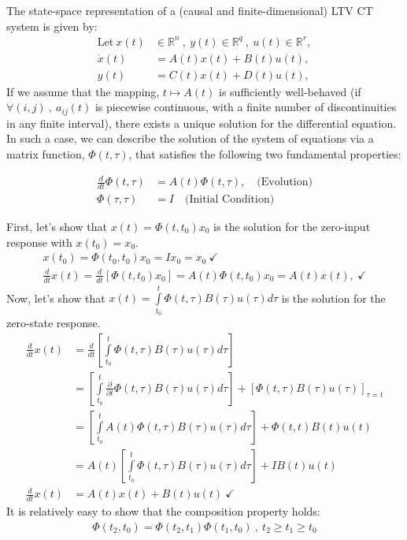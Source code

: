 \documentclass[twoside]{article}
\begin{document}
The state-space representation of a (causal and finite-dimensional) LTV CT system is given by:
%
\begin{align*}
  \mathrm{Let} \ x(t) &\in \mathbb{R}^n \ , \ y(t) \in \mathbb{R}^q \ ,\  u(t) \in \mathbb{R}^r , \\
  \dot{x}(t) &= A(t) x(t) + B(t) u(t) , \\
  y(t) &= C(t) x(t) + D(t) u(t) , 
\end{align*}
%
If we assume that the mapping, $t \mapsto A(t)$ is sufficiently well-behaved (if $\forall (i,j) \ , \ a_{ij}(t)$ is piecewise continuous, with a finite number of discontinuities in any finite interval), there exists a unique solution for the differential equation. In such a case, we can describe the solution of the system of equations via a matrix function, $\Phi(t , \tau)$, that satisfies the following two fundamental properties:
%
\begin{mdframed}[backgroundcolor=black!5, linecolor=black!20]
\begin{align*}
	\frac{d}{dt} \Phi(t , \tau) &= A(t) \Phi(t , \tau) , \quad \text{(Evolution)}
	\\
	\Phi(\tau , \tau) &= I \quad \text{(Initial Condition)}
\end{align*}
\end{mdframed}
%
First, let's show that $x(t) = \Phi(t , t_0) x_0$ is the solution for the zero-input response with $x(t_0) = x_0$.
%
\begin{align*}
	x(t_0) = \Phi(t_0 , t_0) x_0 = I x_0 = x_0 \ \checkmark
	\\
	\frac{d}{dt} x(t) = \frac{d}{dt} \left[ \Phi(t , t_0) x_0 \right] = A(t) \Phi(t , t_0 ) x_0 = A(t) x(t) , \ \checkmark
\end{align*}
%
Now, let's show that $x(t) = \int\limits_{t_0}^{t} \Phi(t , \tau) B(\tau) u(\tau) d\tau$ is the solution for the zero-state response.
%
\begin{align*}
	\frac{d}{dt} x(t) &= \frac{d}{dt} \left[ \int\limits_{t_0}^{t} \Phi(t , \tau) B(\tau) u(\tau) d\tau \right]
	\\
	&= \left[ \int\limits_{t_0}^{t} \frac{\partial}{\partial t} \Phi(t , \tau) B(\tau) u(\tau) d\tau \right] + \left[ \Phi(t , \tau) B(\tau) u(\tau) \right]_{\tau = t}
	\\
	&= \left[ \int\limits_{t_0}^{t} A(t) \Phi(t , \tau) B(\tau) u(\tau) d\tau \right] + \Phi(t , t) B(t) u(t) 
	\\
	&= A(t) \left[ \int\limits_{t_0}^{t} \Phi(t , \tau) B(\tau) u(\tau) d\tau \right] + I B(t) u(t) 
	\\
	\frac{d}{dt} x(t) &= A(t) x(t) + B(t) u(t) \ \checkmark
\end{align*}
%
It is relatively easy to show that the composition property holds:
%
\begin{align*}
	\Phi(t_2 , t_0) = \Phi(t_2 , t_1) \Phi(t_1 , t_0) \ , \ t_2 \geq t_1 \geq t_0
\end{align*}
\end{document}
